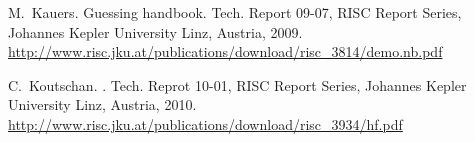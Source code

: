 \documentclass[10pt,a4paper]{article}
\begin{document}
\begin{thebibliography}{10}




M.~Kauers.
\newblock Guessing handbook.
\newblock Tech. Report 09-07, RISC Report Series, Johannes Kepler University Linz, Austria, 2009. \\
\href{http://www.risc.jku.at/publications/download/risc_3814/demo.nb.pdf}{http:/$\!$/www.risc.jku.at/publications/download/risc\_3814/demo.nb.pdf}

% 
% 
% 
C.~Koutschan.
.
\newblock Tech. Reprot 10-01, RISC Report Series, Johannes Kepler University Linz, Austria, 2010. \\
\href{http://www.risc.jku.at/publications/download/risc_3934/hf.pdf}{http:/$\!$/www.risc.jku.at/publications/download/risc\_3934/hf.pdf}


\end{thebibliography}
\end{document}
